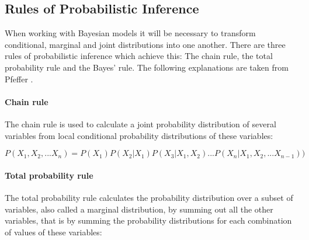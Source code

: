 \documentclass{article}
\begin{document}
%


\pagebreak
\let\LaTeXStandardClearpage\clearpage
\let\clearpage\relax  %
\listoffigures
\listoftables
\let\clearpage\LaTeXStandardClearpage %
\lstlistoflistings

\pagebreak        



\pagebreak
\begin{appendices}
\section{Rules of Probabilistic Inference}
\label{appendix:Rules of Probabilistic Inference}

When working with Bayesian models it will be necessary to transform conditional, marginal and joint distributions into one another. There are three rules of probabilistic inference which achieve this: The chain rule, the total probability rule and the Bayes' rule. The following explanations are taken from Pfeffer \cite{9781617292330}.

\paragraph{Chain rule}

The chain rule is used to calculate a \gls{joint probability distribution} of several variables from local \gls{conditional probability distribution}s of these variables:

\begin{equation}
P(X_1 ,X_2 ,...X_n ) = P(X_1 )P(X_2 | X_1 )P(X_3 | X_1 ,X_2 )...P(X_n | X_1 ,X_2 ,...X_{n-1}) )
\end{equation}

\paragraph{Total probability rule}

The total probability rule calculates the probability distribution over a subset of variables, also called a \gls{marginal distribution}, by summing out all the other variables, that is by summing the probability distributions for each combination of values of these variables:


\end{appendices}
\end{document}
